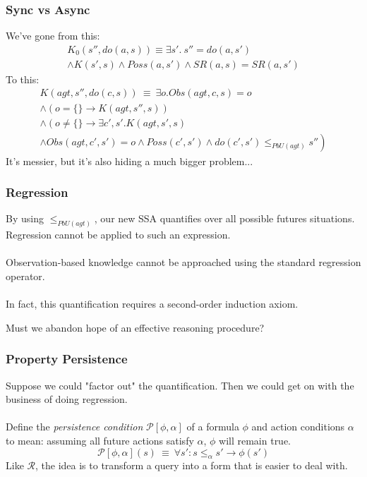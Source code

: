 \documentclass{beamer}
\begin{document}
\begin{frame}
\frametitle{Sync vs Async}
We've gone from this:
\begin{multline*}
 K_0(s'',do(a,s)) \equiv \exists s' . \ s''=do(a,s') \\
 \wedge K(s',s) \wedge Poss(a,s') \wedge SR(a,s) = SR(a,s')
\end{multline*}
\pause
To this:
\begin{multline*}
  K(agt,s'',do(c,s))\ \equiv\ \exists o . Obs(agt,c,s) = o  \\
  \wedge \left(o = \{\} \rightarrow K(agt,s'',s)\right) \\
  \wedge \left(o \neq \{\} \rightarrow \exists c',s' . K(agt,s',s)\right. \\
  \left.\wedge Obs(agt,c',s') = o \wedge Poss(c',s') \wedge do(c',s') \leq_{PbU(agt)} s''\right)
\end{multline*}
\pause
It's messier, but it's also hiding a much bigger problem...
\end{frame}

\begin{frame}
\frametitle{Regression}
By using $\leq_{PbU(agt)}$, our new SSA quantifies over all possible futures situations.  Regression cannot be applied to such an expression.
\ \\
\ \\
Observation-based knowledge \alert{cannot} be approached using
the standard regression operator.
\ \\
\ \\
\pause
In fact, this quantification requires a second-order induction axiom.

Must we abandon hope of an effective reasoning procedure?
\end{frame}

\begin{frame}
\frametitle{Property Persistence}
Suppose we could "factor out" the quantification. Then we could get
on with the business of doing regression.
\ \\
\ \\
Define the \emph{persistence condition} $\mathcal{P}[\phi,\alpha]$ of a formula
 $\phi$ and action conditions $\alpha$ to mean: assuming all future actions
satisfy $\alpha$, $\phi$ will remain true.
\begin{equation*}
  \mathcal{P}[\phi,\alpha](s)\ \equiv\ \forall s': s \leq_{\alpha} s' \rightarrow \phi(s')
\end{equation*}
Like $\mathcal{R}$, the idea is to transform a query into a form that is easier
to deal with.
\end{frame}
\end{document}
